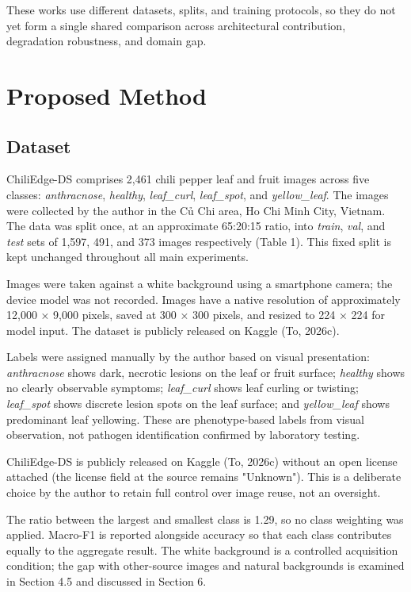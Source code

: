 These works use different datasets, splits, and training protocols, so they do not yet form a single shared comparison across architectural contribution, degradation robustness, and domain gap.

\FloatBarrier

\section{Proposed Method}\label{proposed-method}

\subsection{Dataset}\label{dataset}

ChiliEdge-DS comprises 2,461 chili pepper leaf and fruit images across five classes: \emph{anthracnose}, \emph{healthy}, \emph{leaf\_curl}, \emph{leaf\_spot}, and \emph{yellow\_leaf}. The images were collected by the author in the Củ Chi area, Ho Chi Minh City, Vietnam. The data was split once, at an approximate 65:20:15 ratio, into \emph{train}, \emph{val}, and \emph{test} sets of 1,597, 491, and 373 images respectively (Table 1). This fixed split is kept unchanged throughout all main experiments.

Images were taken against a white background using a smartphone camera; the device model was not recorded. Images have a native resolution of approximately 12,000 × 9,000 pixels, saved at 300 × 300 pixels, and resized to 224 × 224 for model input. The dataset is publicly released on Kaggle (To, 2026c).

Labels were assigned manually by the author based on visual presentation: \emph{anthracnose} shows dark, necrotic lesions on the leaf or fruit surface; \emph{healthy} shows no clearly observable symptoms; \emph{leaf\_curl} shows leaf curling or twisting; \emph{leaf\_spot} shows discrete lesion spots on the leaf surface; and \emph{yellow\_leaf} shows predominant leaf yellowing. These are phenotype-based labels from visual observation, not pathogen identification confirmed by laboratory testing.

ChiliEdge-DS is publicly released on Kaggle (To, 2026c) without an open license attached (the license field at the source remains "Unknown"). This is a deliberate choice by the author to retain full control over image reuse, not an oversight.

The ratio between the largest and smallest class is 1.29, so no class weighting was applied. Macro-F1 is reported alongside accuracy so that each class contributes equally to the aggregate result. The white background is a controlled acquisition condition; the gap with other-source images and natural backgrounds is examined in Section 4.5 and discussed in Section 6.

